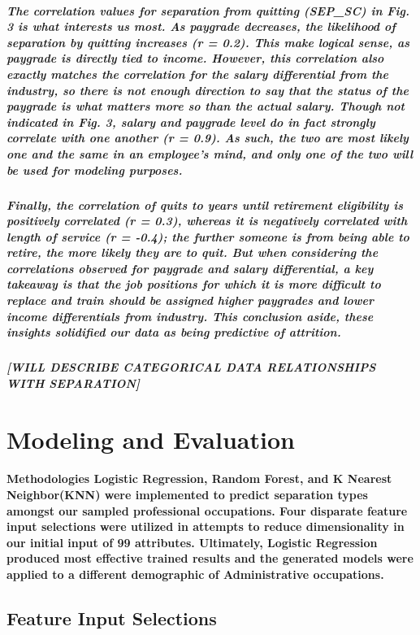 \documentclass{article}
\begin{document}
\subparagraph{The correlation values for separation from quitting (SEP\_SC) in Fig. 3 is what interests us most.  As paygrade decreases, the likelihood of separation by quitting increases (r = 0.2). This make logical sense, as paygrade is directly tied to income.  However, this correlation also exactly matches the correlation for the salary differential from the industry, so there is not enough direction to say that the status of the paygrade is what matters more so than the actual salary. Though not indicated in Fig. 3, salary and paygrade level do in fact strongly correlate with one another (r = 0.9). As such, the two are most likely one and the same in an employee's mind, and only one of the two will be used for modeling purposes.}
 
\subparagraph{Finally, the correlation of quits to years until retirement eligibility is positively correlated (r = 0.3), whereas it is negatively correlated with length of service (r = -0.4); the further someone is from being able to retire, the more likely they are to quit. But when considering the correlations observed for paygrade and salary differential, a key takeaway is that the job positions for which it is more difficult to replace and train should be assigned higher paygrades and lower income differentials from industry. This conclusion aside, these insights solidified our data as being predictive of attrition.}

\subparagraph{[WILL DESCRIBE CATEGORICAL DATA RELATIONSHIPS WITH SEPARATION]}

\section{Modeling and Evaluation}

\paragraph{Methodologies Logistic Regression, Random Forest, and K Nearest Neighbor(KNN) were implemented to predict separation types amongst our sampled professional occupations. Four disparate feature input selections were utilized in attempts to reduce dimensionality in our initial input of 99 attributes. Ultimately, Logistic Regression produced most effective trained results and the generated models were applied to a different demographic of Administrative occupations.}
 
\subsection{Feature Input Selections}
\end{document}
